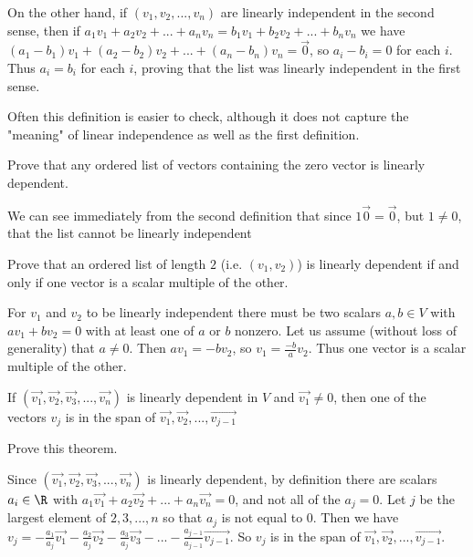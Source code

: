 \documentclass{ximera}
\begin{document}
\begin{Basis and Dimension}
\begin{free-response}
	On the other hand, if $(v_1,v_2,...,v_n)$ are linearly independent in the second sense, then if $a_1v_1+a_2v_2 + ...+a_nv_n = b_1v_1 + b_2v_2 + ... + b_nv_n$ we have
	$(a_1-b_1)v_1+(a_2-b_2)v_2+...+(a_n-b_n)v_n = \vec{0}$, so $a_i-b_i=0$ for each $i$.  Thus $a_i=b_i$ for each $i$, proving that the list was linearly independent 
	in the first sense.
 \end{free-response}
 
  	Often this definition is easier to check, although it does not capture the "meaning" of linear independence as well as the first definition.

 
 	Prove that any ordered list of vectors containing the zero vector is linearly dependent. 
	\begin{free-response}
		We can see immediately from the second definition that since $1\vec{0} = \vec{0}$, but $1\neq 0$, that the list cannot be linearly independent
	\end{free-response}
 
 	Prove that an ordered list of length $2$ (i.e. $(v_1,v_2)$) is linearly dependent if and only if one vector is a scalar multiple of the other.
	\begin{free-response}
		For $v_1$ and $v_2$ to be linearly independent there must be two scalars $a,b \in V$ with $av_1+bv_2=0$ with at least one of $a$ or $b$ nonzero.
		Let us assume (without loss of generality) that $a \neq 0$.  Then $av_1=-bv_2$, so $v_1=\frac{-b}{a}v_2$.  Thus one vector is a scalar multiple of the other.	
	
		\end{free-response}


 \begin{theorem}
 	If $(\vec{v_1},\vec{v_2},\vec{v_3}, ..., \vec{v_n})$ is linearly dependent in $V$ and $\vec{v_1} \neq 0$, then one of the vectors $v_j$ is in the 
 	span of $\vec{v_1},\vec{v_2},...,\vec{v_{j-1}}$
 \end{theorem}
 
Prove this theorem.

\begin{free-response}
 	Since $(\vec{v_1},\vec{v_2},\vec{v_3}, ..., \vec{v_n})$ is linearly dependent, by definition there are scalars $a_i \in \R$ with 
 	$a_1\vec{v_1}+a_2\vec{v_2}+ ...+a_n\vec{v_n} = 0$, and not all of the $a_j =0$.  Let $j$ be the largest element of ${2,3,...,n}$ so that $a_j$ is not equal to $0$.
 	Then we have 
 	$v_j = -\frac{a_1}{a_j}\vec{v_1}-\frac{a_2}{a_j}\vec{v_2} -\frac{a_3}{a_j}\vec{v_3} - ...-\frac{a_{j-1}}{a_{j-1}}\vec{v_{j-1}}$.
 	So $v_j$ is in the span of $\vec{v_1},\vec{v_2},...,\vec{v_{j-1}}$.
 \end{free-response}
 

\end{Basis and Dimension}
\end{document}
